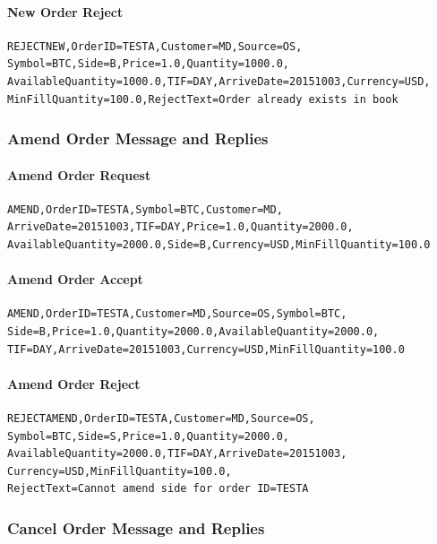 \documentclass[Letter]{article}
\begin{document}
\paragraph{New Order Reject}
\begin{verbatim}
REJECTNEW,OrderID=TESTA,Customer=MD,Source=OS,
Symbol=BTC,Side=B,Price=1.0,Quantity=1000.0,
AvailableQuantity=1000.0,TIF=DAY,ArriveDate=20151003,Currency=USD,
MinFillQuantity=100.0,RejectText=Order already exists in book
\end{verbatim}

\subsubsection{Amend Order Message and Replies}

\paragraph{Amend Order Request}
\begin{verbatim}
AMEND,OrderID=TESTA,Symbol=BTC,Customer=MD,
ArriveDate=20151003,TIF=DAY,Price=1.0,Quantity=2000.0,
AvailableQuantity=2000.0,Side=B,Currency=USD,MinFillQuantity=100.0
\end{verbatim}

\paragraph{Amend Order Accept}
\begin{verbatim}
AMEND,OrderID=TESTA,Customer=MD,Source=OS,Symbol=BTC,
Side=B,Price=1.0,Quantity=2000.0,AvailableQuantity=2000.0,
TIF=DAY,ArriveDate=20151003,Currency=USD,MinFillQuantity=100.0
\end{verbatim}

\paragraph{Amend Order Reject}
\begin{verbatim}
REJECTAMEND,OrderID=TESTA,Customer=MD,Source=OS,
Symbol=BTC,Side=S,Price=1.0,Quantity=2000.0,
AvailableQuantity=2000.0,TIF=DAY,ArriveDate=20151003,
Currency=USD,MinFillQuantity=100.0,
RejectText=Cannot amend side for order ID=TESTA
\end{verbatim}

\subsubsection{Cancel Order Message and Replies}
\end{document}
